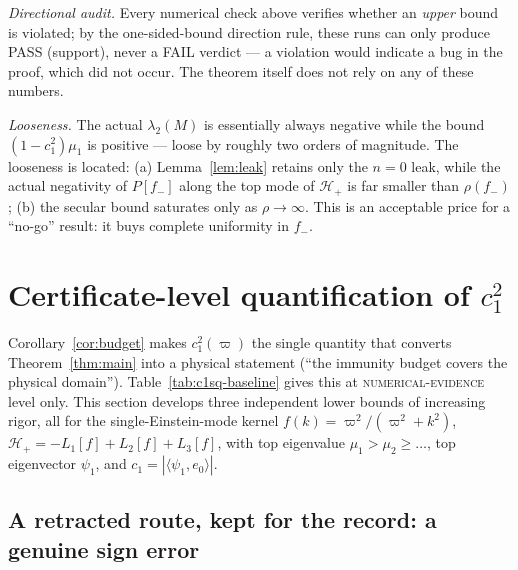 \documentclass[11pt]{article}
\newcommand{\HH}{\mathcal{H}}
\begin{document}
\emph{Directional audit.} Every numerical check above verifies whether an
\emph{upper} bound is violated; by the one-sided-bound direction rule, these
runs can only produce PASS (support), never a FAIL verdict --- a violation
would indicate a bug in the proof, which did not occur. The theorem itself
does not rely on any of these numbers.

\emph{Looseness.} The actual $\lambda_2(M)$ is essentially always negative
while the bound $(1-c_1^2)\mu_1$ is positive --- loose by roughly two orders
of magnitude. The looseness is located: (a) Lemma~\ref{lem:leak} retains only
the $n=0$ leak, while the actual negativity of $P[f_-]$ along the top mode of
$\HH_+$ is far smaller than $\rho(f_-)$; (b) the secular bound saturates only
as $\rho\to\infty$. This is an acceptable price for a ``no-go'' result: it
buys complete uniformity in $f_-$.

\section{Certificate-level quantification of $c_1^2$}\label{sec:c1sq}

Corollary~\ref{cor:budget} makes $c_1^2(\varpi)$ the single quantity that
converts Theorem~\ref{thm:main} into a physical statement (``the immunity
budget covers the physical domain''). Table~\ref{tab:c1sq-baseline} gives
this at \textsc{numerical-evidence} level only. This section develops three
independent lower bounds of increasing rigor, all for the single-Einstein-mode
kernel $f(k)=\varpi^2/(\varpi^2+k^2)$, $\HH_+=-L_1[f]+L_2[f]+L_3[f]$, with
top eigenvalue $\mu_1>\mu_2\ge\dots$, top eigenvector $\psi_1$, and
$c_1=|\langle\psi_1,e_0\rangle|$.

\subsection{A retracted route, kept for the record: a genuine sign error}\label{sec:c1sq-fail}
\end{document}
